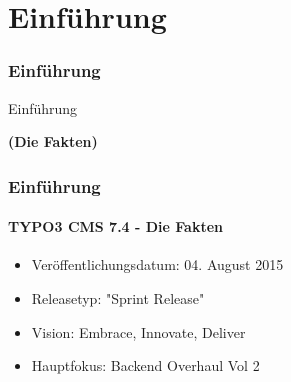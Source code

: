 %

\section{Einführung}
\begin{frame}[fragile]
	\frametitle{Einführung}

	\begin{center}\huge{Einführung}\end{center}
	\begin{center}\huge{\color{typo3darkgrey}\textbf{(Die Fakten)}}\end{center}

\end{frame}

\begin{frame}[fragile]
	\frametitle{Einführung}
	\framesubtitle{TYPO3 CMS 7.4 - Die Fakten}

	\begin{itemize}
		\item Veröffentlichungsdatum: 04. August 2015
		\item Releasetyp: "Sprint Release"
		\item Vision: Embrace, Innovate, Deliver
		\item Hauptfokus: Backend Overhaul Vol 2
	\end{itemize}

\end{frame}

